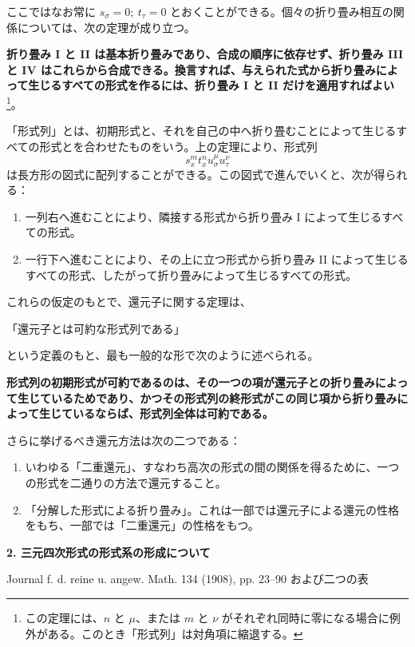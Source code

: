 \documentclass[11pt]{article}
\begin{document}
ここではなお常に \(s_\sigma=0;\ t_\tau=0\) とおくことができる。個々の折り畳み相互の関係については、次の定理が成り立つ。

\textbf{折り畳み I と II は基本折り畳みであり、合成の順序に依存せず、折り畳み III と IV はこれらから合成できる。換言すれば、与えられた式から折り畳みによって生じるすべての形式を作るには、折り畳み I と II だけを適用すればよい}\footnote{この定理には、\(n\) と \(\mu\)、または \(m\) と \(\nu\) がそれぞれ同時に零になる場合に例外がある。このとき「形式列」は対角項に縮退する。}。

「形式列」とは、初期形式と、それを自己の中へ折り畳むことによって生じるすべての形式とを合わせたものをいう。上の定理により、形式列
\[
s_x^m t_x^n u_\sigma^\mu u_\tau^\nu
\]
は長方形の図式に配列することができる。この図式で進んでいくと、次が得られる：
\begin{enumerate}
\item 一列右へ進むことにより、隣接する形式から折り畳み I によって生じるすべての形式。
\item 一行下へ進むことにより、その上に立つ形式から折り畳み II によって生じるすべての形式、したがって折り畳みによって生じるすべての形式。
\end{enumerate}

これらの仮定のもとで、還元子に関する定理は、
\begin{center}
「還元子とは可約な形式列である」
\end{center}
という定義のもと、最も一般的な形で次のように述べられる。

\begin{center}
\textbf{形式列の初期形式が可約であるのは、その一つの項が還元子との折り畳みによって生じているためであり、かつその形式列の終形式がこの同じ項から折り畳みによって生じているならば、形式列全体は可約である。}
\end{center}

さらに挙げるべき還元方法は次の二つである：
\begin{enumerate}
\item いわゆる「二重還元」、すなわち高次の形式の間の関係を得るために、一つの形式を二通りの方法で還元すること。
\item 「分解した形式による折り畳み」。これは一部では還元子による還元の性格をもち、一部では「二重還元」の性格をもつ。
\end{enumerate}

\clearpage

\begin{center}
{\Large\bfseries 2. 三元四次形式の形式系の形成について}\par
\vspace{1.5em}
Journal f. d. reine u. angew. Math. 134 (1908), pp. 23--90 および二つの表
\end{center}
\end{document}

